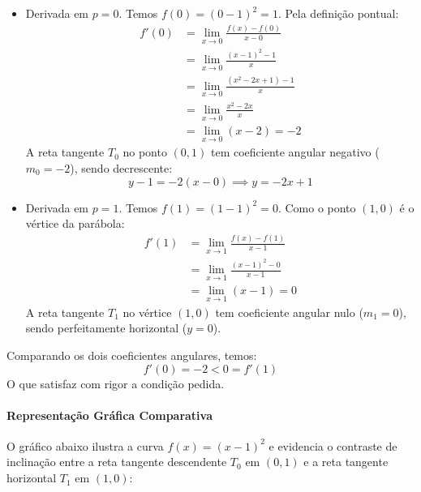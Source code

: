 \begin{itemize}[noitemsep, topsep=2pt]
    \item Derivada em $p = 0$. Temos $f(0) = (0 - 1)^2 = 1$. Pela definição pontual:
    \begin{align*}
    f'(0) &= \lim_{x \to 0} \frac{f(x) - f(0)}{x - 0} \\
          &= \lim_{x \to 0} \frac{(x - 1)^2 - 1}{x} \\
          &= \lim_{x \to 0} \frac{(x^2 - 2x + 1) - 1}{x} \\
          &= \lim_{x \to 0} \frac{x^2 - 2x}{x} \\
          &= \lim_{x \to 0} (x - 2) = -2
    \end{align*}
    A reta tangente $T_0$ no ponto $(0, 1)$ tem coeficiente angular negativo ($m_0 = -2$), sendo decrescente:
    \[
    y - 1 = -2(x - 0) \implies y = -2x + 1
    \]

    \item Derivada em $p = 1$. Temos $f(1) = (1 - 1)^2 = 0$. Como o ponto $(1, 0)$ é o vértice da parábola:
    \begin{align*}
    f'(1) &= \lim_{x \to 1} \frac{f(x) - f(1)}{x - 1} \\
          &= \lim_{x \to 1} \frac{(x - 1)^2 - 0}{x - 1} \\
          &= \lim_{x \to 1} (x - 1) = 0
    \end{align*}
    A reta tangente $T_1$ no vértice $(1, 0)$ tem coeficiente angular nulo ($m_1 = 0$), sendo perfeitamente horizontal ($y = 0$).
\end{itemize}
Comparando os dois coeficientes angulares, temos:
\[
f'(0) = -2 < 0 = f'(1)
\]
O que satisfaz com rigor a condição pedida.

\paragraph{Representação Gráfica Comparativa}

O gráfico abaixo ilustra a curva $f(x) = (x - 1)^2$ e evidencia o contraste de inclinação entre a reta tangente descendente $T_0$ em $(0, 1)$ e a reta tangente horizontal $T_1$ em $(1, 0)$:

